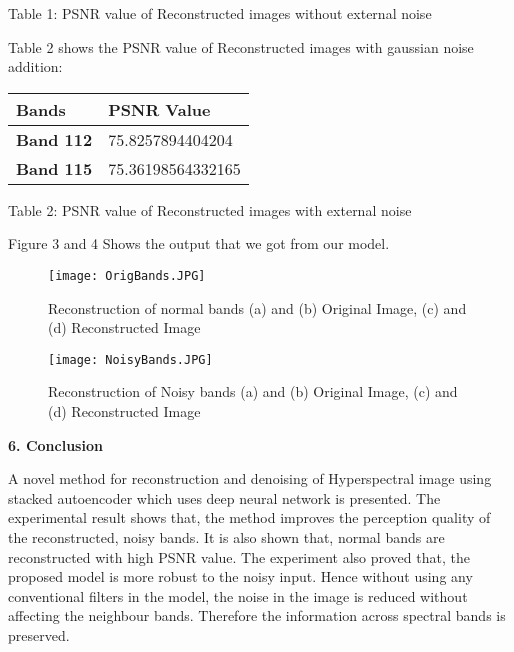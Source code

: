 \documentclass{article}
\begin{document}
\begin{center}
Table 1: PSNR value of Reconstructed images without external noise\\
\end{center}


Table 2 shows the PSNR value of Reconstructed images with gaussian noise addition:\\

\begin{center}
    \def\arraystretch{1.5}%
    \begin{tabular}{ | l | l |}
    \hline
        \textbf{Bands} & \textbf{PSNR Value}\\
    \hline
        \textbf{Band 112}  &  75.8257894404204\\
    \hline
        \textbf{Band 115}  &  75.36198564332165\\
    \hline
    \end{tabular}
\end{center}

\begin{center}
Table 2: PSNR value of Reconstructed images with external noise\\
\end{center}

Figure 3 and 4 Shows the output that we got from our model.\\

\begin{figure}[htp]
    \centering
    \Large\texttt{[image: OrigBands.JPG]}
    \caption{Reconstruction of normal bands (a) and (b) Original Image, (c) and (d) Reconstructed Image}
    \label{fig:OrigBands}
\end{figure}

\begin{figure}[htp]
    \centering
    \Large\texttt{[image: NoisyBands.JPG]}
    \caption{Reconstruction of Noisy bands (a) and (b) Original Image, (c) and (d) Reconstructed Image}
    \label{fig:NoisyBands}
\end{figure}

\newpage

\begin{flushleft}
\textbf{\large 6. Conclusion}
\end{flushleft}

A novel method for reconstruction and denoising of Hyperspectral image using stacked autoencoder which uses deep neural network is presented. The experimental result shows that, the method improves the perception quality of the reconstructed, noisy bands. It is also shown that, normal bands are reconstructed with high PSNR value. The experiment also proved that, the proposed model is more robust to the noisy input. Hence without using any conventional filters in the model, the noise in the image is reduced without affecting the neighbour bands. Therefore the information across spectral bands is preserved.\\
\end{document}
